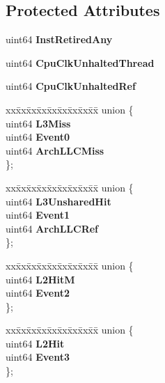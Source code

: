 \subsection*{Protected Attributes}
\begin{DoxyCompactItemize}
\item 
uint64 {\bfseries Inst\+Retired\+Any}\label{classBasicCounterState_a32d89649ba3e48ad8d0cfe05b0e5e2fb}

\item 
uint64 {\bfseries Cpu\+Clk\+Unhalted\+Thread}\label{classBasicCounterState_aa55976b14e3f5d61eac958ea5f80f35c}

\item 
uint64 {\bfseries Cpu\+Clk\+Unhalted\+Ref}\label{classBasicCounterState_a9c64ac8f2c735b0a693a066ff99b9bc1}

\item 
\begin{tabbing}
xx\=xx\=xx\=xx\=xx\=xx\=xx\=xx\=xx\=\kill
union \{\\
\>uint64 {\bfseries L3Miss}\\
\>uint64 {\bfseries Event0}\\
\>uint64 {\bfseries ArchLLCMiss}\\
\}; \label{classBasicCounterState_a959ed48b231cadff965fa70acd60ade7}
\\

\end{tabbing}\item 
\begin{tabbing}
xx\=xx\=xx\=xx\=xx\=xx\=xx\=xx\=xx\=\kill
union \{\\
\>uint64 {\bfseries L3UnsharedHit}\\
\>uint64 {\bfseries Event1}\\
\>uint64 {\bfseries ArchLLCRef}\\
\}; \label{classBasicCounterState_a21d9f8b810e7625a425c469cd6fae52f}
\\

\end{tabbing}\item 
\begin{tabbing}
xx\=xx\=xx\=xx\=xx\=xx\=xx\=xx\=xx\=\kill
union \{\\
\>uint64 {\bfseries L2HitM}\\
\>uint64 {\bfseries Event2}\\
\}; \label{classBasicCounterState_a26f75e8ad60efecbdb155be81cc78ab8}
\\

\end{tabbing}\item 
\begin{tabbing}
xx\=xx\=xx\=xx\=xx\=xx\=xx\=xx\=xx\=\kill
union \{\\
\>uint64 {\bfseries L2Hit}\\
\>uint64 {\bfseries Event3}\\
\}; \label{classBasicCounterState_a4916830df8f468c47f33b7e9d66fdd22}
\\


\end{tabbing}
\end{DoxyCompactItemize}
